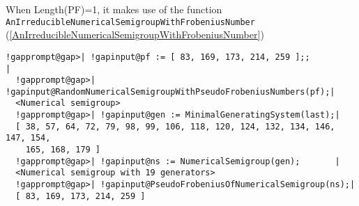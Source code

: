 \documentclass[a4paper,11pt]{report}
\begin{document}
{{{ When Length(PF)=1, it makes use of the function \texttt{AnIrreducibleNumericalSemigroupWithFrobeniusNumber} (\ref{AnIrreducibleNumericalSemigroupWithFrobeniusNumber}) 

 
\begin{Verbatim}[commandchars=!@|,fontsize=\small,frame=single,label=Example]
  !gapprompt@gap>| !gapinput@pf := [ 83, 169, 173, 214, 259 ];;                     |
  !gapprompt@gap>| !gapinput@RandomNumericalSemigroupWithPseudoFrobeniusNumbers(pf);|
  <Numerical semigroup>
  !gapprompt@gap>| !gapinput@gen := MinimalGeneratingSystem(last);|
  [ 38, 57, 64, 72, 79, 98, 99, 106, 118, 120, 124, 132, 134, 146, 147, 154, 
    165, 168, 179 ]
  !gapprompt@gap>| !gapinput@ns := NumericalSemigroup(gen);       |
  <Numerical semigroup with 19 generators>
  !gapprompt@gap>| !gapinput@PseudoFrobeniusOfNumericalSemigroup(ns);|
  [ 83, 169, 173, 214, 259 ]
\end{Verbatim}
 }

 }

 }

 
\end{document}
